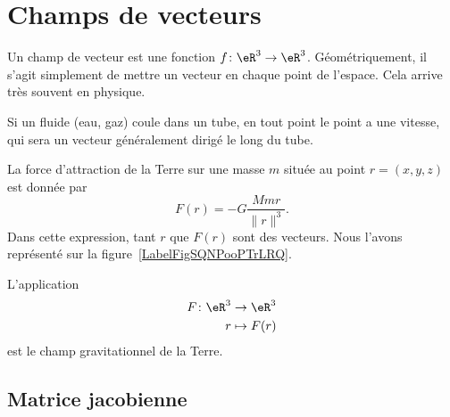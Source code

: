 \section{Champs de vecteurs}

Un champ de vecteur est une fonction \( f\colon \eR^3\to \eR^3\). Géométriquement, il s'agit simplement de mettre un vecteur en chaque point de l'espace. Cela arrive très souvent en physique.

\begin{example}
	Si un fluide (eau, gaz) coule dans un tube, en tout point le point a une vitesse, qui sera un vecteur généralement dirigé le long du tube.
\end{example}

\begin{example}
	La force d'attraction de la Terre sur une masse \( m\) située au point \( r=(x,y,z)\) est donnée par
	\begin{equation}
		F(r)=-G\frac{ Mmr }{ \| r \|^3 }.
	\end{equation}
	Dans cette expression, tant \( r\) que \( F(r)\) sont des vecteurs. Nous l'avons représenté sur la figure~\ref{LabelFigSQNPooPTrLRQ}. %
	\newcommand{\CaptionFigSQNPooPTrLRQ}{Le champ de gravitation de la Terre.}
	

	L'application
	\begin{equation}
		\begin{aligned}
			F\colon \eR^3 & \to \eR^3    \\
			r             & \mapsto F(r)
		\end{aligned}
	\end{equation}
	est le champ gravitationnel de la Terre.

\end{example}

\subsection{Matrice jacobienne}

